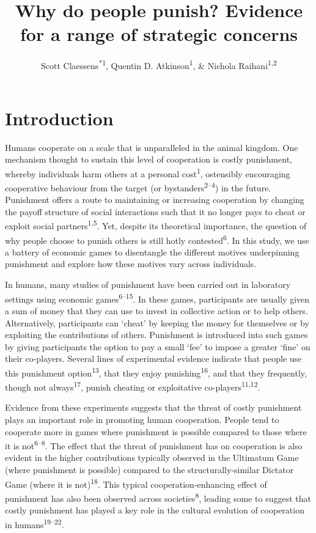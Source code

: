 \documentclass[
  man,floatsintext]{apa6}
\title{Why do people punish? Evidence for a range of strategic concerns}
\author{Scott Claessens\textsuperscript{*1}, Quentin D. Atkinson\textsuperscript{1}, \& Nichola Raihani\textsuperscript{1,2}}
\date{}
\affiliation{\vspace{0.5cm}\textsuperscript{1} \footnotesize School of Psychology, University of Auckland, Auckland, New Zealand\\\textsuperscript{2} \footnotesize Department of Experimental Psychology, University College London, London, United Kingdom}
\begin{document}
\maketitle

\nolinenumbers

\hypertarget{introduction}{%
\section{Introduction}\label{introduction}}

Humans cooperate on a scale that is unparalleled in the animal kingdom. One
mechanism thought to sustain this level of cooperation is costly punishment,
whereby individuals harm others at a personal cost\textsuperscript{1},
ostensibly encouraging cooperative behaviour from the target (or bystanders\textsuperscript{2--4}) in the future. Punishment offers a
route to maintaining or increasing cooperation by changing the payoff structure
of social interactions such that it no longer pays to cheat or exploit social
partners\textsuperscript{1,5}. Yet, despite its theoretical
importance, the question of why people choose to punish others is still hotly
contested\textsuperscript{6}. In this study, we use a battery of economic games to
disentangle the different motives underpinning punishment and explore how these
motives vary across individuals.

In humans, many studies of punishment have been carried out in laboratory
settings using economic games\textsuperscript{6--15}. In these games, participants are usually given a sum of money
that they can use to invest in collective action or to help others.
Alternatively, participants can `cheat' by keeping the money for themselves or
by exploiting the contributions of others. Punishment is introduced into such
games by giving participants the option to pay a small `fee' to impose a greater
`fine' on their co-players. Several lines of experimental evidence indicate that
people use this punishment option\textsuperscript{13}, that they enjoy
punishing\textsuperscript{16}, and that they frequently, though not
always\textsuperscript{17}, punish cheating or exploitative
co-players\textsuperscript{11,12}.

Evidence from these experiments suggests that the threat of costly punishment
plays an important role in promoting human cooperation. People tend to cooperate
more in games where punishment is possible compared to those where it is not\textsuperscript{6--8}. The effect that the threat of
punishment has on cooperation is also evident in the higher contributions
typically observed in the Ultimatum Game (where punishment is possible) compared
to the structurally-similar Dictator Game (where it is not)\textsuperscript{18}. This
typical cooperation-enhancing effect of punishment has also been observed across
societies\textsuperscript{8}, leading some to suggest that costly punishment has
played a key role in the cultural evolution of cooperation in humans\textsuperscript{19--22}.
\end{document}
